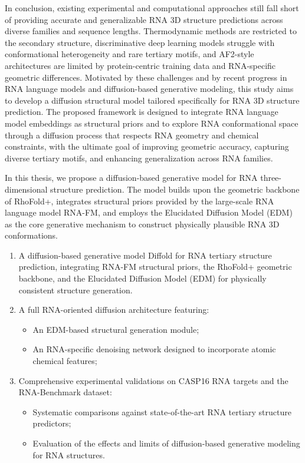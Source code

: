 In conclusion, existing experimental and computational approaches still fall short of providing accurate and generalizable RNA 3D structure predictions across diverse families and sequence lengths. Thermodynamic methods are restricted to the secondary structure, discriminative deep learning models struggle with conformational heterogeneity and rare tertiary motifs, and AF2-style architectures are limited by protein-centric training data and RNA-specific geometric differences. Motivated by these challenges and by recent progress in RNA language models and diffusion-based generative modeling, this study aims to develop a diffusion structural model tailored specifically for RNA 3D structure prediction. The proposed framework is designed to integrate RNA language model embeddings as structural priors and to explore RNA conformational space through a diffusion process that respects RNA geometry and chemical constraints, with the ultimate goal of improving geometric accuracy, capturing diverse tertiary motifs, and enhancing generalization across RNA families.

\bigskip

In this thesis, we propose a diffusion-based generative model for RNA three-dimensional structure prediction. The model builds upon the geometric backbone of RhoFold+, integrates structural priors provided by the large-scale RNA language model RNA-FM, and employs the Elucidated Diffusion Model (EDM) as the core generative mechanism to construct physically plausible RNA 3D conformations\cite{Karras2022EDM}.


\begin{enumerate}
    \item {A diffusion-based generative model Diffold for RNA tertiary structure prediction}, 
          integrating RNA-FM structural priors, the RhoFold+ geometric backbone, and 
          the Elucidated Diffusion Model (EDM) for physically consistent structure generation.

    \item {A full RNA-oriented diffusion architecture} featuring:
    \begin{itemize}
        \item An EDM-based structural generation module;
        \item An RNA-specific denoising network designed to incorporate atomic chemical features;
    \end{itemize}

    \item {Comprehensive experimental validations} on CASP16 RNA targets and the RNA-Benchmark dataset:
    \begin{itemize}
        \item Systematic comparisons against state-of-the-art RNA tertiary structure predictors;
        \item Evaluation of the effects and limits of diffusion-based generative modeling for RNA structures.
    \end{itemize}
\end{enumerate}

